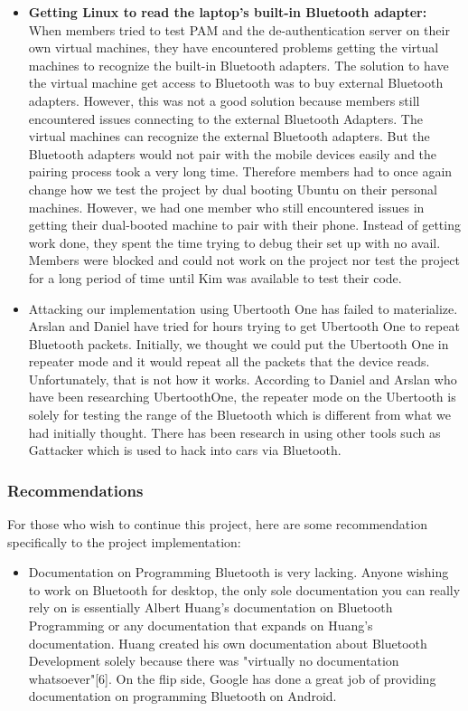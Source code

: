 \documentclass[letterpaper,twocolumn,10pt]{article}
\begin{document}
{{\begin{itemize}[noitemsep]
\item \textbf{Getting Linux to read the laptop's built-in Bluetooth adapter:} When members tried to test PAM and the de-authentication server on their own virtual machines, they have encountered problems getting the virtual machines to recognize the built-in Bluetooth adapters. The solution to have the virtual machine get access to Bluetooth was to buy external Bluetooth adapters. However, this was not a good solution because members still encountered issues connecting to the external Bluetooth Adapters. The virtual machines can recognize the external Bluetooth adapters. But the Bluetooth adapters would not pair with the mobile devices easily and the pairing process took a very long time. Therefore members had to once again change how we test the project by dual booting Ubuntu on their personal machines. However, we had one member who still encountered issues in getting their dual-booted machine to pair with their phone. Instead of getting work done, they spent the time trying to debug their set up with no avail. Members were blocked and could not work on the project nor test the project for a long period of time until Kim was available to test their code.

\item Attacking our implementation using Ubertooth One has failed to materialize. Arslan and Daniel have tried for hours trying to get Ubertooth One to repeat Bluetooth packets. Initially, we thought we could put the Ubertooth One in repeater mode and it would repeat all the packets that the device reads. Unfortunately, that is not how it works. According to Daniel and Arslan who have been researching UbertoothOne, the repeater mode on the Ubertooth is solely for testing the range of the Bluetooth which is different from what we had initially thought.  There has been research in using other tools such as Gattacker which is used to hack into cars via Bluetooth.
\end{itemize}

\subsubsection{Recommendations}

For those who wish to continue this project, here are some recommendation specifically to the project implementation:
\begin{singlespacing}
\begin{itemize}
\item Documentation on Programming Bluetooth is very lacking. Anyone wishing to work on Bluetooth for desktop, the only sole documentation you can really rely on is essentially Albert Huang's documentation on Bluetooth Programming or any documentation that expands on Huang's documentation. Huang created his own documentation about Bluetooth Development solely because there was "virtually no documentation whatsoever"[6]. On the flip side, Google has done a great job of providing documentation on programming Bluetooth on Android.


\end{itemize}
\end{singlespacing}}}
\end{document}
